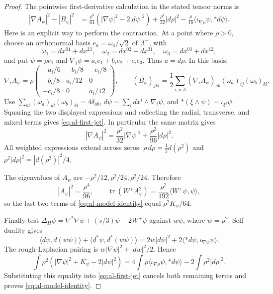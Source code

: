 \begin{proof}
The pointwise first-derivative calculation in the stated tensor norms is
\begin{align}
 |\nabla A_\psi|^2-|B_\psi|^2
 &=\frac{\rho^2}{64}(|\nabla\psi|^2-2|d\psi|^2)
   +\frac{\rho^2}{32}|d\rho|^2
   -\frac{\rho}{16}\langle\iota_{\nabla\rho}\psi,*d\psi\rangle.
 \label{eq:al-first-jet}
\end{align}
Here is an explicit way to perform the contraction.  At a point where
$\rho>0$, choose an orthonormal basis $e_a=\omega_a/\sqrt2$ of
$\Lambda^+$, with
\[
 \omega_1=dx^{01}+dx^{23},\quad
 \omega_2=dx^{02}+dx^{31},\quad
 \omega_3=dx^{03}+dx^{12},
\]
and put $\psi=\rho e_1$ and
$\nabla_i\psi=a_i e_1+b_i e_2+c_i e_3$.  Thus $a=d\rho$.
In this basis,
\[
 \nabla_iA_\psi=\rho
 \begin{pmatrix}
 -a_i/6&-b_i/8&-c_i/8\\
 -b_i/8&a_i/12&0\\
 -c_i/8&0&a_i/12
 \end{pmatrix},\qquad
 (B_\psi)_{jkl}
 =\frac12\sum_{i,a,b}(\nabla_iA_\psi)_{ab}
                         (\omega_a)_{ij}(\omega_b)_{kl}.
\]
Use $\sum_{kl}(\omega_a)_{kl}(\omega_b)_{kl}=4\delta_{ab}$,
$d\psi=\sum_i dx^i\wedge\nabla_i\psi$, and
$*(\xi\wedge\psi)=\iota_{\xi^\sharp}\psi$.
Squaring the two displayed expressions and collecting the radial,
transverse, and mixed terms gives \eqref{eq:al-first-jet}.  In particular
the same matrix gives
\begin{equation}\label{eq:al-model-gradient}
 |\nabla A_\psi|^2
 =\frac{\rho^2}{32}|\nabla\psi|^2
  +\frac{\rho^2}{96}|d\rho|^2.
\end{equation}
All weighted expressions extend across zeros: $\rho\,d\rho
=\tfrac12d(\rho^2)$ and $\rho^2|d\rho|^2=|d(\rho^2)|^2/4$.

The eigenvalues of $A_\psi$ are
$-\rho^2/12,\rho^2/24,\rho^2/24$.  Therefore
\[
 |A_\psi|^2=\frac{\rho^4}{96},\qquad
 \operatorname{tr}(W^+A_\psi^2)
 =\frac{\rho^2}{192}\langle W^+\psi,\psi\rangle,
\]
so the last two terms of \eqref{eq:al-model-identity} equal
$\rho^2K_\psi/64$.

Finally test
$\Delta_H\psi=\nabla^*\nabla\psi+(s/3)\psi-2W^+\psi$
against $w\psi$, where $w=\rho^2$.  Self-duality gives
\[
 \langle d\psi,d(w\psi)\rangle
 +\langle d^*\psi,d^*(w\psi)\rangle
 =2w|d\psi|^2+2\langle*d\psi,\iota_{\nabla w}\psi\rangle.
\]
The rough-Laplacian pairing is
$w|\nabla\psi|^2+|dw|^2/2$.  Hence
\begin{equation}\label{eq:al-weighted-hodge}
 \int\rho^2(|\nabla\psi|^2+K_\psi-2|d\psi|^2)
 =4\int\rho\langle\iota_{\nabla\rho}\psi,*d\psi\rangle
  -2\int\rho^2|d\rho|^2.
\end{equation}
Substituting this equality into \eqref{eq:al-first-jet} cancels both
remaining terms and proves \eqref{eq:al-model-identity}.
\end{proof}

